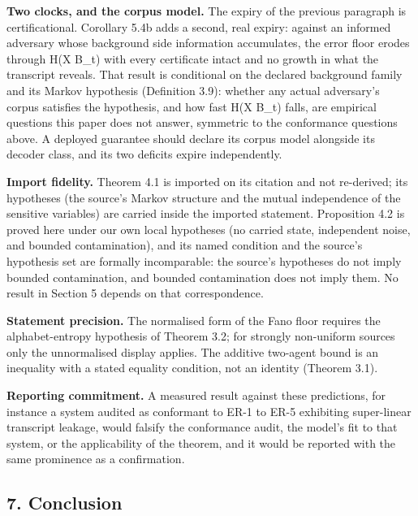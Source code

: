\documentclass[
  11pt,
]{article}
\begin{document}
\textbf{Two clocks, and the corpus model.} The expiry of the previous
paragraph is certificational. Corollary 5.4b adds a second, real expiry:
against an informed adversary whose background side information
accumulates, the error floor erodes through H(X \textbar{} B\_t) with
every certificate intact and no growth in what the transcript reveals.
That result is conditional on the declared background family and its
Markov hypothesis (Definition 3.9): whether any actual adversary's
corpus satisfies the hypothesis, and how fast H(X \textbar{} B\_t)
falls, are empirical questions this paper does not answer, symmetric to
the conformance questions above. A deployed guarantee should declare its
corpus model alongside its decoder class, and its two deficits expire
independently.

\textbf{Import fidelity.} Theorem 4.1 is imported on its citation and
not re-derived; its hypotheses (the source's Markov structure and the
mutual independence of the sensitive variables) are carried inside the
imported statement. Proposition 4.2 is proved here under our own local
hypotheses (no carried state, independent noise, and bounded
contamination), and its named condition and the source's hypothesis set
are formally incomparable: the source's hypotheses do not imply bounded
contamination, and bounded contamination does not imply them. No result
in Section 5 depends on that correspondence.

\textbf{Statement precision.} The normalised form of the Fano floor
requires the alphabet-entropy hypothesis of Theorem 3.2; for strongly
non-uniform sources only the unnormalised display applies. The additive
two-agent bound is an inequality with a stated equality condition, not
an identity (Theorem 3.1).

\textbf{Reporting commitment.} A measured result against these
predictions, for instance a system audited as conformant to ER-1 to ER-5
exhibiting super-linear transcript leakage, would falsify the
conformance audit, the model's fit to that system, or the applicability
of the theorem, and it would be reported with the same prominence as a
confirmation.

\subsection{7. Conclusion}\label{conclusion}
\end{document}

